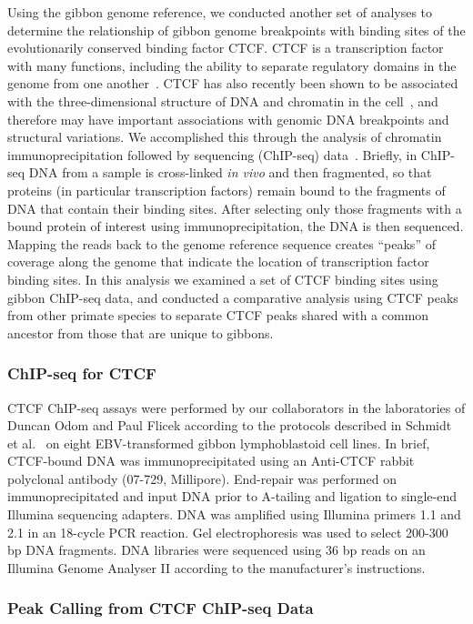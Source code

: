 Using the gibbon genome reference, we conducted another set of analyses to determine the relationship of gibbon genome breakpoints with binding sites of the evolutionarily conserved binding factor CTCF. CTCF is a transcription factor with many functions, including the ability to separate regulatory domains in the genome from one another~\cite{Phillips:2009fr}. CTCF has also recently been shown to be associated with the three-dimensional structure of DNA and chromatin in the cell~\cite{Dixon:2012gc}, and therefore may have important associations with genomic DNA breakpoints and structural variations. We accomplished this through the analysis of chromatin immunoprecipitation followed by sequencing (ChIP-seq) data~\cite{Park:2009gl}. Briefly, in ChIP-seq DNA from a sample is cross-linked \emph{in vivo} and then fragmented, so that proteins (in particular transcription factors) remain bound to the fragments of DNA that contain their binding sites. After selecting only those fragments with a bound protein of interest using immunoprecipitation, the DNA is then sequenced. Mapping the reads back to the genome reference sequence creates ``peaks'' of coverage along the genome that indicate the location of transcription factor binding sites. In this analysis we examined a set of CTCF binding sites using gibbon ChIP-seq data, and conducted a comparative analysis using CTCF peaks from other primate species to separate CTCF peaks shared with a common ancestor from those that are unique to gibbons.

\subsubsection{ChIP-seq for CTCF}

CTCF ChIP-seq assays were performed by our collaborators in the laboratories of Duncan Odom and Paul Flicek according to the protocols described in Schmidt et al.~\cite{Schmidt:2012dt} on eight EBV-transformed gibbon lymphoblastoid cell lines. In brief, CTCF-bound DNA was immunoprecipitated using an Anti-CTCF rabbit polyclonal antibody (07-729, Millipore). End-repair was performed on immunoprecipitated and input DNA prior to A-tailing and ligation to single-end Illumina sequencing adapters. DNA was amplified using Illumina primers 1.1 and 2.1 in an 18-cycle PCR reaction. Gel electrophoresis was used to select 200-300 bp DNA fragments. DNA libraries were sequenced using 36 bp reads on an Illumina Genome Analyser II according to the manufacturer's instructions.

\subsubsection{Peak Calling from CTCF ChIP-seq Data}

